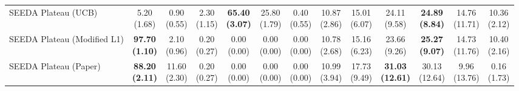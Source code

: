 \begin{table}[H]
{\begin{tabular}{l|cccccc|cccccc}
SEEDA Plateau (UCB) & \makecell{5.20 \\ (1.68)} & \makecell{0.90 \\ (0.55)} & {\cellcolor[HTML]{C8E6C9}} \makecell{2.30 \\ (1.15)} & \bfseries \makecell{65.40 \\ (3.07)} & \makecell{25.80 \\ (1.79)} & \makecell{0.40 \\ (0.55)} & \makecell{10.87 \\ (2.86)} & \makecell{15.01 \\ (6.07)} & {\cellcolor[HTML]{C8E6C9}} \makecell{24.11 \\ (9.58)} & \bfseries \makecell{24.89 \\ (8.84)} & \makecell{14.76 \\ (11.71)} & \makecell{10.36 \\ (2.12)} \\
SEEDA Plateau (Modified L1) & \bfseries \makecell{97.70 \\ (1.10)} & \makecell{2.10 \\ (0.96)} & {\cellcolor[HTML]{C8E6C9}} \makecell{0.20 \\ (0.27)} & \makecell{0.00 \\ (0.00)} & \makecell{0.00 \\ (0.00)} & \makecell{0.00 \\ (0.00)} & \makecell{10.78 \\ (2.68)} & \makecell{15.16 \\ (6.23)} & {\cellcolor[HTML]{C8E6C9}} \makecell{23.66 \\ (9.26)} & \bfseries \makecell{25.27 \\ (9.07)} & \makecell{14.73 \\ (11.76)} & \makecell{10.40 \\ (2.16)} \\
SEEDA Plateau (Paper) & \bfseries \makecell{88.20 \\ (2.11)} & \makecell{11.60 \\ (2.30)} & {\cellcolor[HTML]{C8E6C9}} \makecell{0.20 \\ (0.27)} & \makecell{0.00 \\ (0.00)} & \makecell{0.00 \\ (0.00)} & \makecell{0.00 \\ (0.00)} & \makecell{10.99 \\ (3.94)} & \makecell{17.73 \\ (9.49)} & {\cellcolor[HTML]{C8E6C9}} \bfseries \makecell{31.03 \\ (12.61)} & \makecell{30.13 \\ (12.64)} & \makecell{9.96 \\ (13.76)} & \makecell{0.16 \\ (1.73)} \\
\bottomrule
\end{tabular}
}%
\end{table}
